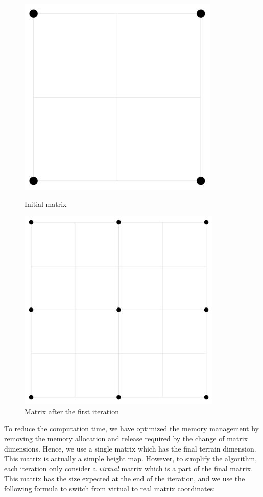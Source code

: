 \begin{figure}[!htb]
    \centering
    \includegraphics{img/ds_init.jpg}
    \caption{Initial matrix}
\endminipage\hfill
{}
    \centering
    \includegraphics{img/ds_final.jpg}
    \caption{Matrix after the first iteration}
\endminipage\hfill
\end{figure}

To reduce the computation time, we have optimized the memory management by removing the memory allocation and release required by the change of matrix dimensions. Hence, we use a single matrix which has the final terrain dimension. This matrix is actually a simple height map. However, to simplify the algorithm, each iteration only consider a \textit{virtual} matrix which is a part of the final matrix. This matrix has the size expected at the end of the iteration, and we use the following formula to switch from virtual to real matrix coordinates:

